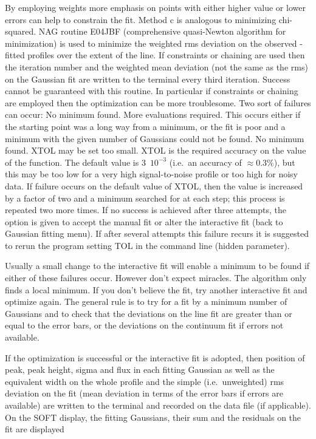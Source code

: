 \begin{itemize}
   By employing weights more emphasis on points with either higher value
   or lower errors can help to constrain the fit. Method c is analogous
   to minimizing chi-squared. NAG routine E04JBF (comprehensive
   quasi-Newton algorithm for minimization) is used to minimize the
   weighted rms deviation on the observed - fitted profiles over the
   extent of the line.  If constraints or chaining are used then the
   iteration number and the weighted mean deviation (not the same as the
   rms) on the Gaussian fit are written to the terminal every third
   iteration. Success cannot be guaranteed with this routine. In
   particular if constraints or chaining are employed then the
   optimization can be more troublesome. Two sort of failures can occur:
   No minimum found. More evaluations required. This occurs either if
   the starting point was a long way from a minimum, or the fit is poor
   and a minimum with the given number of Gaussians could not be found.
   No minimum found. XTOL may be set too small. XTOL is the required
   accuracy on the value of the function. The default value is
   $3$~$10^{-3}$ (i.e.\ an accuracy of $\approx 0.3\%$), but this may be
   too low for a very high signal-to-noise profile or too high for noisy
   data. If failure occurs on the default value of XTOL, then the value
   is increased by a factor of two and a minimum searched for at each
   step; this process is repeated two more times. If no success is
   achieved after three attempts, the option is given to accept the
   manual fit or alter the interactive fit (back to Gaussian fitting
   menu). If after several attempts this failure recurs it is suggested
   to rerun the program setting TOL in the command line (hidden
   parameter).

   Usually a small change to the interactive fit will enable a minimum
   to be found if either of these failures occur. However don't expect
   miracles.  The algorithm only finds a local minimum. If you don't
   believe the fit, try another interactive fit and optimize again. The
   general rule is to try for a fit by a minimum number of Gaussians and
   to check that the deviations on the line fit are greater than or
   equal to the error bars, or the deviations on the continuum fit if
   errors not available.

   If the optimization is successful or the interactive fit is adopted,
   then position of peak, peak height, sigma and flux in each fitting
   Gaussian as well as the equivalent width on the whole profile and the
   simple (i.e.\ unweighted) rms deviation on the fit (mean deviation in
   terms of the error bars if errors are available) are written to the
   terminal and recorded on the data file (if applicable). On the SOFT
   display, the fitting Gaussians, their sum and the residuals on the
   fit are displayed


\end{itemize}
